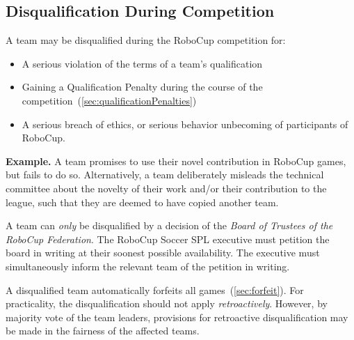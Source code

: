 \subsection{Disqualification During Competition}
\label{sec:disqualification_during_comp}

A team may be disqualified during the RoboCup competition for:
\begin{itemize}
  \item A serious violation of the terms of a team's qualification
  \item Gaining a Qualification Penalty during the course of the competition~(\cf \cref{sec:qualificationPenalties})
  \item A serious breach of ethics, or serious behavior unbecoming of participants of RoboCup.
\end{itemize}

\textbf{Example.} A team promises to use their novel contribution in RoboCup games, but fails to do so.
Alternatively, a team deliberately misleads the technical committee about the novelty of their work and/or their contribution to the league, such that they are deemed to have copied another team.

A team can \textit{only} be disqualified by a decision of the \textit{Board of Trustees of the RoboCup Federation}.
The RoboCup Soccer SPL executive must petition the board in writing at their soonest possible availability.
The executive must simultaneously inform the relevant team of the petition in writing.

A disqualified team automatically forfeits all games~(\cf \cref{sec:forfeit}).
For practicality, the disqualification should not apply \textit{retroactively}.
However, by majority vote of the team leaders, provisions for retroactive disqualification may be made in the fairness of the affected teams.
